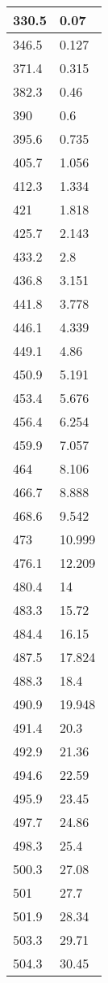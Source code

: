 \begin{tabular}{|l|l|}
\hline
330.5&0.07\\\hline
346.5&0.127\\\hline
371.4&0.315\\\hline
382.3&0.46\\\hline
390&0.6\\\hline
395.6&0.735\\\hline
405.7&1.056\\\hline
412.3&1.334\\\hline
421&1.818\\\hline
425.7&2.143\\\hline
433.2&2.8\\\hline
436.8&3.151\\\hline
441.8&3.778\\\hline
446.1&4.339\\\hline
449.1&4.86\\\hline
450.9&5.191\\\hline
453.4&5.676\\\hline
456.4&6.254\\\hline
459.9&7.057\\\hline
464&8.106\\\hline
466.7&8.888\\\hline
468.6&9.542\\\hline
473&10.999\\\hline
476.1&12.209\\\hline
480.4&14\\\hline
483.3&15.72\\\hline
484.4&16.15\\\hline
487.5&17.824\\\hline
488.3&18.4\\\hline
490.9&19.948\\\hline
491.4&20.3\\\hline
492.9&21.36\\\hline
494.6&22.59\\\hline
495.9&23.45\\\hline
497.7&24.86\\\hline
498.3&25.4\\\hline
500.3&27.08\\\hline
501&27.7\\\hline
501.9&28.34\\\hline
503.3&29.71\\\hline
504.3&30.45\\\hline
\end{tabular}
